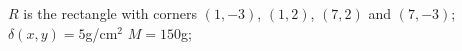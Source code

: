 {$R$ is the rectangle with corners $(1,-3)$, $(1,2)$, $(7,2)$ and $(7,-3)$; $\delta(x,y) = 5$g/cm$^2$
\label{13_04_ex_11}
}
{$M = 150$g;  %
}